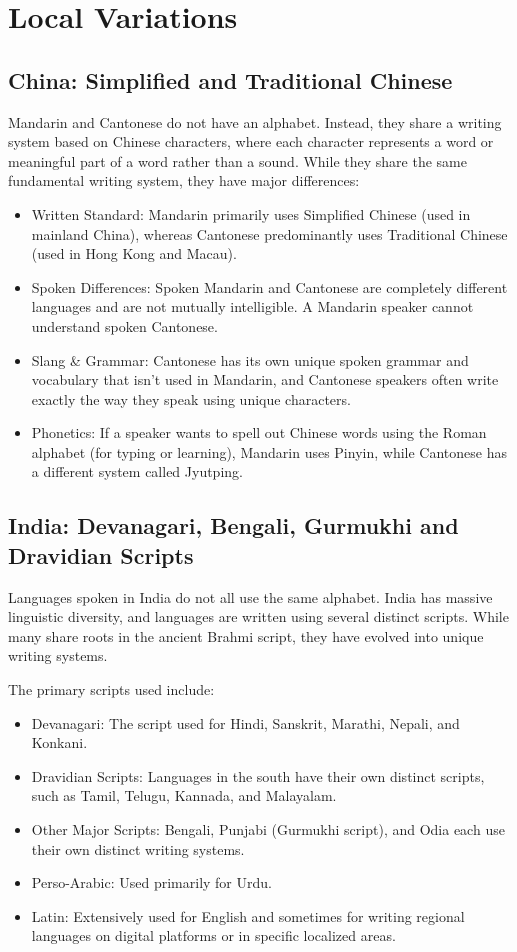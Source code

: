\documentclass[11pt,a4paper]{report}
\begin{document}
\section{Local Variations}

\subsection{China: Simplified and Traditional Chinese}
\label{subsec:china-local}
Mandarin and Cantonese do not have an alphabet. Instead, they share a writing system based on Chinese characters, where each character represents a word or meaningful part of a word rather than a sound. While they share the same fundamental writing system, they have major differences:
\begin{itemize}
  \item Written Standard: Mandarin primarily uses Simplified Chinese (used in mainland China), whereas Cantonese predominantly uses Traditional Chinese (used in Hong Kong and Macau).
  \item Spoken Differences: Spoken Mandarin and Cantonese are completely different languages and are not mutually intelligible. A Mandarin speaker cannot understand spoken Cantonese.
  \item Slang \& Grammar: Cantonese has its own unique spoken grammar and vocabulary that isn't used in Mandarin, and Cantonese speakers often write exactly the way they speak using unique characters.
  \item Phonetics: If a speaker wants to spell out Chinese words using the Roman alphabet (for typing or learning), Mandarin uses Pinyin, while Cantonese has a different system called Jyutping.
\end{itemize}

\subsection{India: Devanagari, Bengali, Gurmukhi and Dravidian Scripts}
 Languages spoken in India do not all use the same alphabet. India has massive linguistic diversity, and languages are written using several distinct scripts. While many share roots in the ancient Brahmi script, they have evolved into unique writing systems.

 The primary scripts used include:
 \begin{itemize}
  \item Devanagari: The script used for Hindi, Sanskrit, Marathi, Nepali, and Konkani.
  \item Dravidian Scripts: Languages in the south have their own distinct scripts, such as Tamil, Telugu, Kannada, and Malayalam.
  \item Other Major Scripts: Bengali, Punjabi (Gurmukhi script), and Odia each use their own distinct writing systems.
  \item Perso-Arabic: Used primarily for Urdu.
  \item Latin: Extensively used for English and sometimes for writing regional languages on digital platforms or in specific localized areas.
 \end{itemize}
\end{document}
